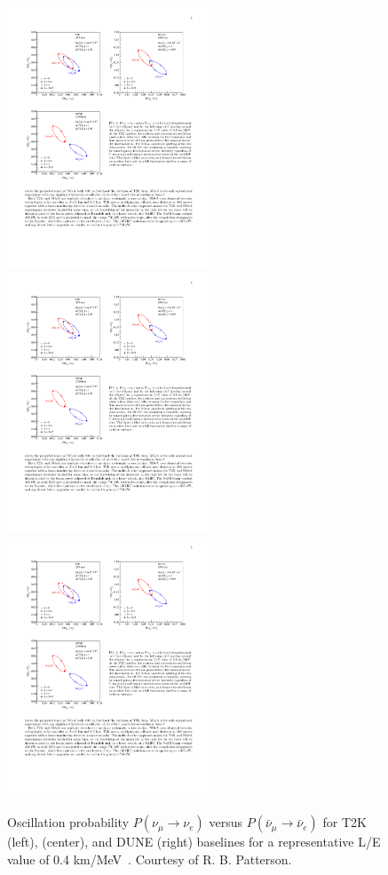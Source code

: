 \begin{figure} [htbp!]
\begin{center}
\includegraphics[width=6cm]{figures/t2k_ellipse.pdf}
\includegraphics[width=6cm]{figures/nova_ellipse.pdf}
\includegraphics[width=6cm]{figures/dune_ellipse.pdf}
\caption{\label{fig:novaellipse} Oscillation probability $ P (\nu_\mu \rightarrow \nu_e)$ versus  $ P (\bar{\nu}_\mu \rightarrow \bar{\nu}_e)$ for T2K (left), \nova (center), and DUNE (right) baselines for a representative L/E value of 0.4 km/MeV~\cite{Patterson:2015xja}. Courtesy of R. B. Patterson.}
\end{center}
\end{figure}

